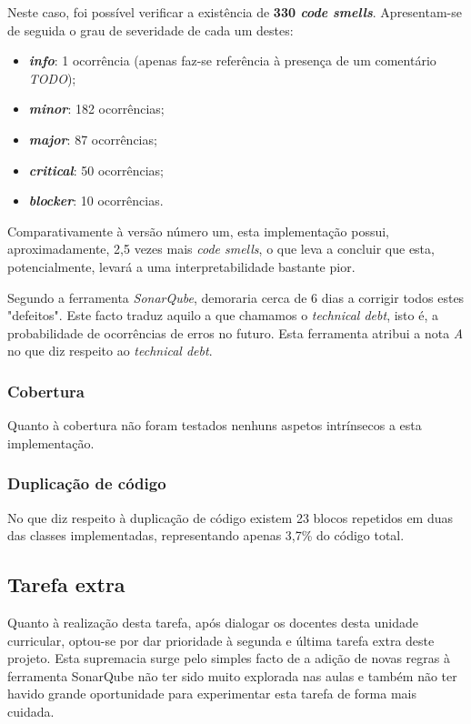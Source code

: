 \documentclass[a4paper]{report}
\begin{document}
Neste caso, foi possível verificar a existência de \textbf{330 \textit{code smells}}. Apresentam-se de seguida o grau de severidade de cada um destes:
\begin{itemize}
    \item \textbf{\textit{info}}: 1 ocorrência (apenas faz-se referência à presença de um comentário \textit{TODO});
    \item \textbf{\textit{minor}}: 182 ocorrências;
    \item \textbf{\textit{major}}: 87 ocorrências;
    \item \textbf{\textit{critical}}: 50 ocorrências;
    \item \textbf{\textit{blocker}}: 10 ocorrências.
\end{itemize}

Comparativamente à versão número um, esta implementação possui, aproximadamente, 2,5 vezes mais \textit{code smells}, o que leva a concluir que esta, potencialmente, levará a uma interpretabilidade bastante pior.

Segundo a ferramenta \textit{SonarQube}, demoraria cerca de 6 dias a corrigir todos estes "defeitos". Este facto traduz aquilo a que chamamos o \textit{technical debt}, isto é, a probabilidade de ocorrências de erros no futuro. Esta ferramenta atribui a nota \textit{A} no que diz respeito ao \textit{technical debt}.

\subsubsection{Cobertura}
Quanto à cobertura não foram testados nenhuns aspetos intrínsecos a esta implementação.

\subsubsection{Duplicação de código}
No que diz respeito à duplicação de código existem 23 blocos repetidos em duas das classes implementadas, representando apenas 3,7\% do código total.

\subsection{Tarefa extra}
Quanto à realização desta tarefa, após dialogar os docentes desta unidade curricular, optou-se por dar prioridade à segunda e última tarefa extra deste projeto. Esta supremacia surge pelo simples facto de a adição de novas regras à ferramenta SonarQube não ter sido muito explorada nas aulas e também não ter havido grande oportunidade para experimentar esta tarefa de forma mais cuidada.
\end{document}
